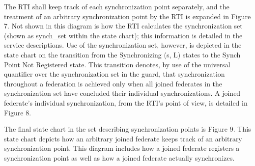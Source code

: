 The RTI shall keep track of each synchronization point separately, and the treatment of an arbitrary synchronization point by the RTI is expanded in Figure 7. Not shown in this diagram is how the RTI calculates the synchronization set (shown as synch\_set within the state chart); this information is detailed in the service descriptions. Use of the synchronization set, however, is depicted in the state chart on the transition from the Synchronizing (s, L) states to the Synch Point Not Registered state. This transition denotes, by use of the universal quantifier over the synchronization set in the guard, that synchronization throughout a federation is achieved only when all joined federates in the synchronization set have concluded their individual synchronizations. A joined federate's individual synchronization, from the RTI's point of view, is detailed in Figure 8.

The final state chart in the set describing synchronization points is Figure 9. This state chart depicts how an arbitrary joined federate keeps track of an arbitrary synchronization point. This diagram includes how a joined federate registers a synchronization point as well as how a joined federate actually synchronizes.

\clearpage

\vspace*{1.12in}

\clearpage

\vspace*{0.4pt}

\vspace*{41.31pt}
\par\vspace{4pt}
\begin{center}
    \makebox[\linewidth][c]{\hspace*{26.2pt}\resizebox{407.04pt}{!}{}}\par
\end{center}
\vspace{1pt}

